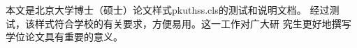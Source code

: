 \begin{conclusion}

本文是北京大学博士（硕士）论文样式pkuthss.cls的测试和说明文档。
经过测试，该样式符合学校的有关要求，方便易用。这一工作对广大研
究生更好地撰写学位论文具有重要的意义。

\end{conclusion}
